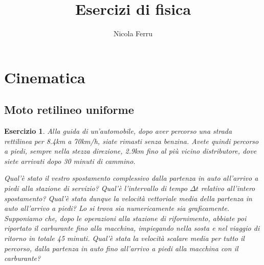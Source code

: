 \documentclass{article}
\title{Esercizi di fisica}
\author{Nicola Ferru}
\newtheorem{es}{Esercizio}
\begin{document}
\maketitle

\section{Cinematica}
\label{sec:cinematica}

\subsection{Moto retilineo uniforme}
\label{sec:motoretuni}

\begin{es}
  Alla guida di un'automobile, dopo aver percorso una strada rettilinea per 8.4km a 70km/h, siate rimasti senza benzina. Avete quindi percorso a piedi, sempre nella stezza direzione, 2.9km fino al più vicino distributore, dove siete arrivati dopo 30 minuti di cammino.
  \begin{tasks}
    \task Qual'è stato il vestro spostamento complessivo dalla partenza in auto all'arrivo a piedi alla stazione di servizio?
    \task Qual'è l'intervallo di tempo $\Delta{}t$ relativo all'intero spostamento?
    \task Qual'è stata dunque la velocità vettoriale media della partenza in auto all'arrivo a piedi? Lo si trova sia numericamente sia graficamente.
    \task Supponiamo che, dopo le operazioni alla stazione di rifornimento, abbiate poi riportato il carburante fino alla macchina, impiegando nella sosta e nel viaggio di ritorno in totale 45 minuti. Qual'è stata la velocità scalare media per tutto il percorso, dalla partenza in auto fino all'arrivo a piedi alla macchina con il carburante?
  \end{tasks}
\end{es}
\end{document}
